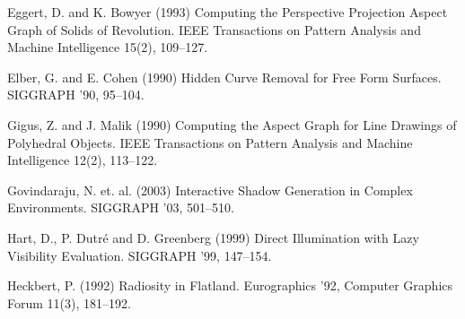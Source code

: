\documentclass[9pt,twocolumn]{article}
\begin{document}
\begin{thebibliography}{99}





Eggert, D. and K. Bowyer (1993)
Computing the Perspective Projection Aspect Graph of Solids of Revolution.
IEEE Transactions on Pattern Analysis and Machine Intelligence 15(2), 109--127.

Elber, G. and E. Cohen (1990)
Hidden Curve Removal for Free Form Surfaces.
SIGGRAPH '90, 95--104.


Gigus, Z. and J. Malik (1990)
Computing the Aspect Graph for Line Drawings of Polyhedral Objects.
IEEE Transactions on Pattern Analysis and Machine Intelligence 12(2), 113--122.

Govindaraju, N. et. al. (2003)
Interactive Shadow Generation in Complex Environments.
SIGGRAPH '03, 501--510.

Hart, D., P. Dutr\'{e} and D. Greenberg (1999)
Direct Illumination with Lazy Visibility Evaluation.
SIGGRAPH '99, 147--154.

Heckbert, P. (1992)
Radiosity in Flatland.
Eurographics '92, Computer Graphics Forum 11(3), 181--192.



\end{thebibliography}
\end{document}
